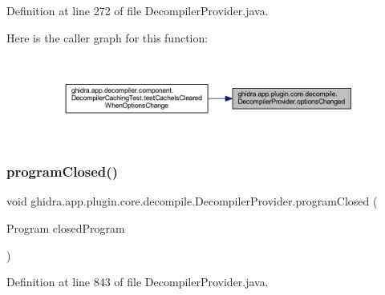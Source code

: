 Definition at line 272 of file Decompiler\+Provider.\+java.

Here is the caller graph for this function\+:
\nopagebreak
\begin{figure}[H]
\begin{center}
\leavevmode
\includegraphics[width=350pt]{classghidra_1_1app_1_1plugin_1_1core_1_1decompile_1_1_decompiler_provider_a480fb4cdd2f86f488d1d269b53c0e872_icgraph}
\end{center}
\end{figure}
\mbox{\label{classghidra_1_1app_1_1plugin_1_1core_1_1decompile_1_1_decompiler_provider_a4745be510ce90f499664f2955f9ec3e4}} 
\subsubsection{\texorpdfstring{programClosed()}{programClosed()}}
{\footnotesize\ttfamily void ghidra.\+app.\+plugin.\+core.\+decompile.\+Decompiler\+Provider.\+program\+Closed (\begin{DoxyParamCaption}\item[{Program}]{closed\+Program }\end{DoxyParamCaption})\hspace{0.3cm}{\ttfamily [inline]}}



Definition at line 843 of file Decompiler\+Provider.\+java.

